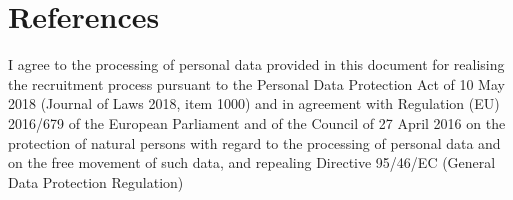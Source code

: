 \documentclass[11pt,a4paper,sans]{moderncv} %
\begin{document}



\section{References}

\vspace{\fill}

I agree to the processing of personal data provided in this document for realising the recruitment process pursuant to the Personal Data Protection Act of 10 May 2018 (Journal of Laws 2018, item 1000) and in agreement with Regulation (EU) 2016/679 of the European Parliament and of the Council of 27 April 2016 on the protection of natural persons with regard to the processing of personal data and on the free movement of such data, and repealing Directive 95/46/EC (General Data Protection Regulation)
\end{document}
